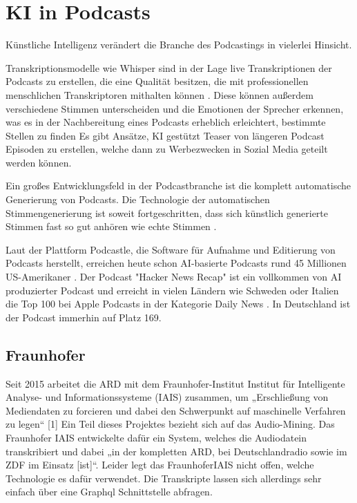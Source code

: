 \section{KI in Podcasts}

Künstliche Intelligenz verändert die Branche des Podcastings in vielerlei Hinsicht. 

Transkriptionsmodelle wie Whisper sind in der Lage live Transkriptionen der Podcasts zu erstellen, die eine Qualität besitzen, die mit professionellen menschlichen Transkriptoren mithalten können \cite{radford}.
Diese können außerdem verschiedene Stimmen unterscheiden und die Emotionen der Sprecher erkennen, was es in der Nachbereitung eines Podcasts erheblich erleichtert, bestimmte Stellen zu finden \cite{wagner2023}
Es gibt Ansätze, KI gestützt Teaser von längeren Podcast Episoden zu erstellen, welche dann zu Werbezwecken in Sozial Media geteilt werden können. \cite{wang2023}

Ein großes Entwicklungsfeld in der Podcastbranche ist die komplett automatische Generierung von Podcasts. Die Technologie der automatischen Stimmengenerierung ist soweit fortgeschritten, dass sich künstlich generierte Stimmen fast so gut anhören wie echte Stimmen \cite{shi2023}.

Laut der Plattform Podcastle, die Software für Aufnahme und Editierung von Podcasts herstellt, 
erreichen heute schon AI-basierte Podcasts rund 45 Millionen US-Amerikaner \cite{podcastle2023}.
Der Podcast "Hacker News Recap" ist ein vollkommen von AI produzierter Podcast und erreicht in vielen Ländern wie Schweden oder Italien die Top 100 bei Apple Podcasts in der Kategorie Daily News \cite{chartable}.
In Deutschland ist der Podcast immerhin auf Platz 169.

\subsection{Fraunhofer}

Seit 2015 arbeitet die ARD mit dem Fraunhofer-Institut Institut für Intelligente Analyse- und Informationssysteme (IAIS) zusammen, um „Erschließung von Mediendaten zu forcieren und dabei den Schwerpunkt auf maschinelle Verfahren zu legen“ [1]
Ein Teil dieses Projektes bezieht sich auf das Audio-Mining. 
Das Fraunhofer IAIS entwickelte dafür ein System, welches die Audiodatein transkribiert und dabei „in der kompletten ARD, bei Deutschlandradio sowie im ZDF im Einsatz [ist]“. 
Leider legt das FraunhoferIAIS nicht offen, welche Technologie es dafür verwendet. 
Die Transkripte lassen sich allerdings sehr einfach über eine Graphql Schnittstelle abfragen. 

